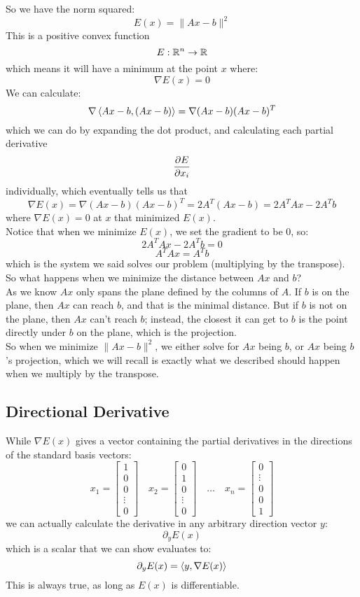 \documentclass[12pt]{article}
\begin{document}
So we have the norm squared:
\[ E(x) = \|Ax - b\|^2 \]
This is a positive convex function
\[ E : \mathbb{R}^n \to \mathbb{R} \]
which means it will have a minimum
at the point $x$ where:
\[ \nabla E(x) = 0 \]
We can calculate:
\[ \nabla \left\langle Ax - b, (Ax - b) \right\rangle 
= \nabla (Ax - b)(Ax - b)^T\]
which we can do by expanding the dot product,
and calculating each partial derivative
\[ \dfrac{\partial E}{\partial x_i} \]
individually,
which eventually tells us that
\[ \nabla E(x) = 
\nabla (Ax - b)(Ax - b)^T
= 2A^T(Ax - b)
= 2A^TAx - 2A^Tb \]
where $\nabla E(x) = 0$
at $x$ that minimized $E(x)$. \\

Notice that when we minimize $E(x)$,
we set the gradient to be $0$, so:
\[ 2A^TAx - 2A^Tb = 0 \]
\[ A^TAx = A^Tb \]
which is the system we said
solves our problem (multiplying by the
transpose). \\

So what happens when we minimize the distance
between $Ax$ and $b$? \\
As we know $Ax$ only spans the plane
defined by the columns of $A$.
If $b$ is on the plane, then $Ax$ can reach $b$,
and that is the minimal distance.
But if $b$ is not on the plane,
then $Ax$ can't reach $b$;
instead, the closest it can get to $b$
is the point directly under $b$
on the plane, which is the projection. \\
So when we minimize $\|Ax - b\|^2$,
we either solve for $Ax$ being $b$,
or $Ax$ being $b$'s projection,
which we will recall is exactly what
we described should happen
when we multiply by the transpose. \\

\newpage

\subsection*{Directional Derivative}

While $\nabla E(x)$ gives 
a vector containing the partial derivatives
in the directions of the standard basis vectors:
\[ x_1 = 
\begin{bmatrix}1 \\ 0 \\ 0 \\ \vdots \\  0\end{bmatrix}
\quad x_2 = 
\begin{bmatrix}0 \\ 1 \\ 0 \\ \vdots \\ 0\end{bmatrix}
\quad \dots \quad x_n = 
\begin{bmatrix}0 \\ \vdots \\ 0 \\ 0 \\ 1\end{bmatrix}\] 
we can actually calculate the derivative in
any arbitrary direction vector $y$:
\[ \partial_yE(x) \]
which is a scalar that we can show evaluates to:
\[ \partial_yE(x) = \left\langle y, \nabla E(x) \right\rangle \]
This is always true,
as long as $E(x)$ is differentiable. \\
\end{document}

